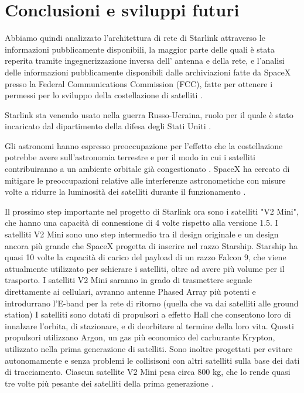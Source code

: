 
\chapter{Conclusioni e sviluppi futuri}
\label{chp:conclusions}

Abbiamo quindi analizzato l'architettura di rete di Starlink attraverso le informazioni pubblicamente disponibili, la maggior parte delle quali è stata reperita tramite ingegnerizzazione inversa dell' antenna e della rete, e l'analisi delle informazioni pubblicamente disponibili dalle archiviazioni fatte da SpaceX presso la Federal Communications Commission (FCC), fatte per ottenere i permessi per lo sviluppo della costellazione di satelliti \cite{jonathan_mcdowell_section_nodate}.

Starlink sta venendo usato nella guerra Russo-Ucraina, ruolo per il quale è stato incaricato dal dipartimento della difesa degli Stati Uniti \cite{amanda_macias_pentagon_2023}.

Gli astronomi hanno espresso preoccupazione per l'effetto che la costellazione potrebbe avere sull'astronomia terrestre e per il modo in cui i satelliti contribuiranno a un ambiente orbitale già congestionato \cite{nadia_drake_will_2019}.
SpaceX ha cercato di mitigare le preoccupazioni relative alle interferenze astronometiche con misure volte a ridurre la luminosità dei satelliti durante il funzionamento \cite{starlink_brightness_nodate}.

Il prossimo step importante nel progetto di Starlink ora sono i satelliti "V2 Mini", che hanno una capacità di connessione di 4 volte rispetto alla versione 1.5.
I satelliti V2 Mini sono uno step intermedio tra il design originale e un design ancora più grande che SpaceX progetta di inserire nel razzo Starship.
Starship ha quasi 10 volte la capacità di carico del payload di un razzo Falcon 9, che viene attualmente utilizzato per schierare i satelliti,  oltre ad avere più volume per il trasporto.
I satelliti V2 Mini saranno in grado di trasmettere segnale direttamente ai cellulari, avranno antenne Phased Array più potenti e introdurrano l'E-band per la rete di ritorno (quella che va dai satelliti alle ground station)
I satelliti sono dotati di propulsori a effetto Hall che consentono loro di innalzare l'orbita, di stazionare, e di deorbitare al termine della loro vita.
Questi propulsori utilizzano Argon, un gas più economico del carburante Krypton, utilizzato nella prima generazione di satelliti.
Sono inoltre progettati per evitare autonomamente e senza problemi le collisisoni con altri satelliti sulla base dei dati di tracciamento.
Ciascun satellite V2 Mini pesa circa 800 kg, che lo rende quasi tre volte più pesante dei satelliti della prima generazione \cite{starlink_secon_nodate}.

